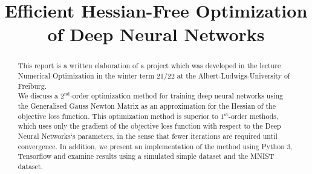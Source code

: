 \documentclass[conference]{IEEEtran}
\begin{document}
	
	\title{Efficient Hessian-Free Optimization of Deep Neural Networks
	}
	
	\author{
		\and
		\and
	}
	
	\maketitle
	\thispagestyle{plain}
	\pagestyle{plain}
	
	\begin{abstract}
		This report is a written elaboration of a project which was developed in the lecture Numerical Optimization in the winter term 21/22 at the Albert-Ludwigs-University of Freiburg.\\
		We discuss a $2^{\text{nd}}$-order optimization method for training deep neural networks using the Generalised Gauss Newton Matrix as an approximation for the Hessian of the objective loss function. {\color{red}This optimization method is superior to $1^{\text{st}}$-order methods}, which uses only the gradient of the objective loss function with respect to the Deep Neural Networks`s parameters, in the sense that fewer iterations are required until convergence. In addition, we present an implementation of the method using Python 3, Tensorflow and examine results using a simulated simple dataset and the MNIST dataset.
	\end{abstract}
	
\end{document}
